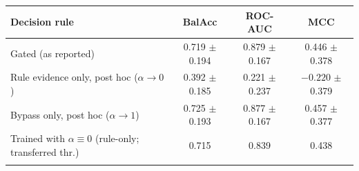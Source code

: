 \documentclass[pdflatex,sn-basic,Numbered]{sn-jnl}
\makeatletter
\newenvironment{suptable}{\par\bigskip\noindent\begin{minipage}{\textwidth}\def\@captype{table}\centering\tablebodyfont}{\end{minipage}\par\bigskip}
\makeatother
\begin{document}
\begin{suptable}
\caption{Fidelity of the rule pathway to the decision (Section~3.3; \texttt{rule\_fidelity.py} on the fold checkpoints of the decoder). $\alpha$ = learned bypass gate of Eq.~(6), unchanged from its initialisation (0.570, range 0.567--0.573); ``agreement'' = share of held-out epochs on which $\arg\max R$ equals the gated decision (39.4\%); rule margin versus logit margin $r=-0.69$; rule attention uniform. Post-hoc rows force $\alpha$ at inference (decision at 0.5, no temperature scaling); the last row is trained with $\alpha\equiv0$ and reported at the transferred threshold, where the decoder reaches 0.747, 0.879 and 0.485 (paired Wilcoxon $p=0.047$, $0.014$ and $0.11$ for balanced accuracy, ROC-AUC and MCC); at the calibrated operating point of the rows above it reaches balanced accuracy 0.734 and MCC 0.497 ($p=0.50$ and $0.23$ against the gated decoder).}\label{tabS13}
\footnotesize
\setlength{\tabcolsep}{3pt}\begin{tabular*}{\linewidth}{@{\extracolsep{\fill}}lccc@{}}
\toprule
Decision rule & BalAcc & ROC-AUC & MCC \\
\midrule
Gated (as reported) & 0.719 $\pm$ 0.194 & 0.879 $\pm$ 0.167 & 0.446 $\pm$ 0.378 \\
Rule evidence only, post hoc ($\alpha\to0$) & 0.392 $\pm$ 0.185 & 0.221 $\pm$ 0.237 & $-0.220$ $\pm$ 0.379 \\
Bypass only, post hoc ($\alpha\to1$) & 0.725 $\pm$ 0.193 & 0.877 $\pm$ 0.167 & 0.457 $\pm$ 0.377 \\
Trained with $\alpha\equiv0$ (rule-only; transferred thr.) & 0.715 & 0.839 & 0.438 \\
\botrule
\end{tabular*}
\end{suptable}
\end{document}
